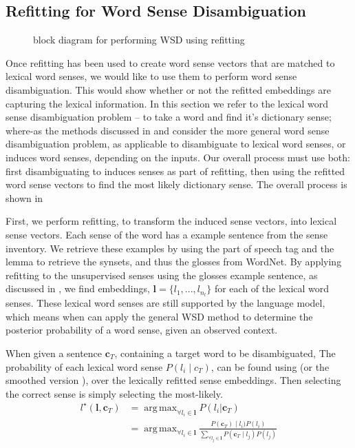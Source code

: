 \documentclass{sig-alternate}
\renewcommand{\c}{\mathbf{c}}
\renewcommand{\l}{\mathbf{l}}
\DeclareMathOperator*{\argmax}{arg\,max}
\begin{document}
\subsection{Refitting for Word Sense Disambiguation} \label{lexicalWSD}
\begin{figure}
	\begin{adjustbox}{max width=\columnwidth}
		
	\end{adjustbox}
	\caption{ block diagram for performing WSD using refitting} \label{WSDBlock}
\end{figure}
Once refitting has been used to create word sense vectors that are matched to lexical word senses, we would like to use them to perform word sense disambiguation. This would show whether or not the refitted embeddings are capturing the lexical information. In this section we refer to the lexical word sense disambiguation problem -- to take a word and find it's dictionary sense; where-as the methods discussed in  and  consider the more general word sense disambiguation problem, as applicable to disambiguate to lexical word senses, or induces word senses, depending on the inputs. Our overall process must use both: first disambiguating to induces senses as part of refitting, then using the refitted word sense vectors to find the most likely dictionary sense.
The overall process is shown in 


First, we perform refitting, to transform the induced sense vectors, into lexical sense vectors. Each sense of the word has a example sentence from the sense inventory. We retrieve these examples by using the part of speech tag and the lemma to retrieve the synsets, and thus the glosses from WordNet. By applying refitting to the unsupervised senses using the glosses example sentence, as discussed in , we find embeddings, $\l=\{l_1,..., l_{n_l}\}$ for each of the lexical word senses. These lexical word senses are still supported by the language model, which means when can apply the general WSD method to determine the posterior probability of a word sense, given an observed context. 

When given a sentence $\c_{T}$, containing a target word to be disambiguated, 
The probability of each lexical word sense $P(l_i \mid c_{T})$, can be found using  (or the smoothed version ), over the lexically refitted sense embeddings. Then selecting the correct sense is simply selecting the most-likely.
\begin{equation}
\begin{aligned}\label{eq:lexicalwsd}
l^\star (\l, \c_T) &= \argmax_{\forall l_i \in \l} P(l_i|\c_T) \\
&= \argmax_{\forall l_i \in \l} \frac{P(\c_T) \mid l_i)P(l_i)}{\sum_{\forall l_j \in \l} P(\c_T \mid l_j)P(l_j)}
\end{aligned}
\end{equation}
\end{document}
